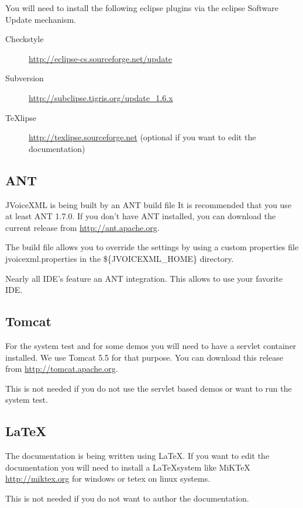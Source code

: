 \documentclass[11pt,a4paper]{article}
\begin{document}
You will need to install the following eclipse plugins via the eclipse
Software Update mechanism.

\begin{description}
\item[Checkstyle] \url{http://eclipse-cs.sourceforge.net/update}
\item[Subversion] \url{http://subclipse.tigris.org/update_1.6.x}
\item[TeXlipse] \url{http://texlipse.sourceforge.net} (optional if you want to
edit the documentation)
\end{description}

\subsection{ANT}
\label{sec:ant}

JVoiceXML is being built by an ANT build file It is recommended that
you use at least ANT 1.7.0. 
If you don't have ANT installed, you can download the current release
from \url{http://ant.apache.org}.

The build file allows you to override the settings by using a custom 
properties file jvoicexml.properties in the \$\{JVOICEXML\_HOME\}
directory.

Nearly all IDE's feature an ANT integration. This allows to use
your favorite IDE.

\subsection{Tomcat}
\label{sec:tomcat}

For the system test and for some demos you will need to have a servlet
container installed. We use Tomcat 5.5 for that purpose. You can download this
release from \url{http://tomcat.apache.org}.

This is not needed if you do not use the servlet based demos or want to run the
system test.

\subsection{\LaTeX}

The documentation is being written using \LaTeX. If you want to edit the
documentation you will need to install a \LaTeX system like MiKTeX
\url{http://miktex.org} for windows or tetex on linux systems.

This is not needed if you do not want to author the documentation.
\end{document}
